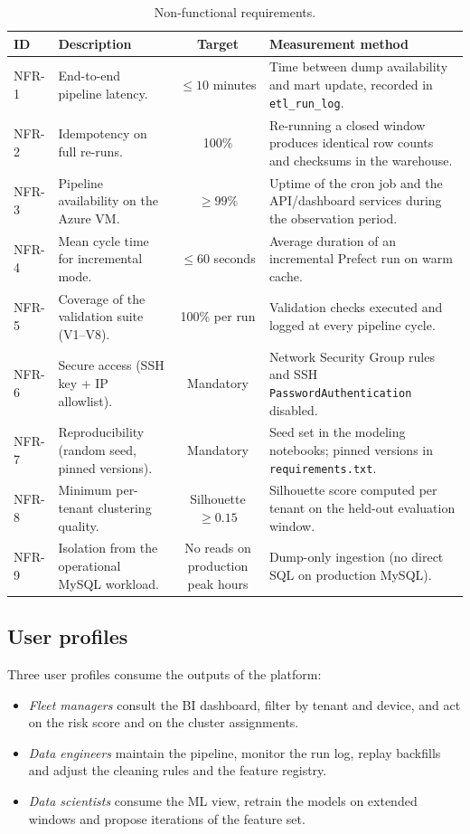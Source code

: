 \begin{table}[h]
\centering
\caption{Non-functional requirements.}
\label{tab:nfr}
\begin{tabular}{|l|p{5.0cm}|c|p{4.3cm}|}
\hline
\textbf{ID} & \textbf{Description} & \textbf{Target} & \textbf{Measurement method} \\
\hline
NFR-1 & End-to-end pipeline latency. & $\le 10$ minutes & Time between dump availability and mart update, recorded in \texttt{etl\_run\_log}. \\
NFR-2 & Idempotency on full re-runs. & 100\% & Re-running a closed window produces identical row counts and checksums in the warehouse. \\
NFR-3 & Pipeline availability on the Azure VM. & $\ge 99\%$ & Uptime of the cron job and the API/dashboard services during the observation period. \\
NFR-4 & Mean cycle time for incremental mode. & $\le 60$ seconds & Average duration of an incremental Prefect run on warm cache. \\
NFR-5 & Coverage of the validation suite (V1--V8). & 100\% per run & Validation checks executed and logged at every pipeline cycle. \\
NFR-6 & Secure access (SSH key + IP allowlist). & Mandatory & Network Security Group rules and SSH \texttt{PasswordAuthentication} disabled. \\
NFR-7 & Reproducibility (random seed, pinned versions). & Mandatory & Seed set in the modeling notebooks; pinned versions in \texttt{requirements.txt}. \\
NFR-8 & Minimum per-tenant clustering quality. & Silhouette $\ge 0.15$ & Silhouette score computed per tenant on the held-out evaluation window. \\
NFR-9 & Isolation from the operational MySQL workload. & No reads on production peak hours & Dump-only ingestion (no direct SQL on production MySQL). \\
\hline
\end{tabular}
\end{table}

\subsection{User profiles}
Three user profiles consume the outputs of the platform:

\begin{itemize}
    \item \emph{Fleet managers} consult the BI dashboard, filter by tenant and device, and act on the risk score and on the cluster assignments.
    \item \emph{Data engineers} maintain the pipeline, monitor the run log, replay backfills and adjust the cleaning rules and the feature registry.
    \item \emph{Data scientists} consume the ML view, retrain the models on extended windows and propose iterations of the feature set.
\end{itemize}

